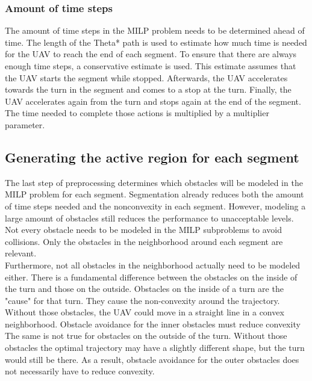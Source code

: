 %

\subsubsection{Amount of time steps}
The amount of time steps in the MILP problem needs to be determined ahead of time. The length of the Theta* path is used to estimate how much time is needed for the UAV to reach the end of each segment. To ensure that there are always enough time steps, a conservative estimate is used. This estimate assumes that the UAV starts the segment while stopped. Afterwards, the UAV accelerates towards the turn in the segment and comes to a stop at the turn. Finally, the UAV accelerates again from the turn and stops again at the end of the segment. The time needed to complete those actions is multiplied by a multiplier parameter.



\subsection{Generating the active region for each segment}
The last step of preprocessing determines which obstacles will be modeled in the MILP problem for each segment. Segmentation already reduces both the amount of time steps needed and the nonconvexity in each segment. However, modeling a large amount of obstacles still reduces the performance to unacceptable levels. \\
Not every obstacle needs to be modeled in the MILP subproblems to avoid collisions. Only the obstacles in the neighborhood around each segment are relevant. \\
Furthermore, not all obstacles in the neighborhood actually need to be modeled either. There is a fundamental difference between the obstacles on the inside of the turn and those on the outside. Obstacles on the inside of a turn are the "cause" for that turn. They cause the non-convexity around the trajectory. Without those obstacles, the UAV could move in a straight line in a convex neighborhood. Obstacle avoidance for the inner obstacles must reduce convexity\\
The same is not true for obstacles on the outside of the turn. Without those obstacles the optimal trajectory may have a slightly different shape, but the turn would still be there. As a result, obstacle avoidance for the outer obstacles does not necessarily have to reduce convexity. \\

